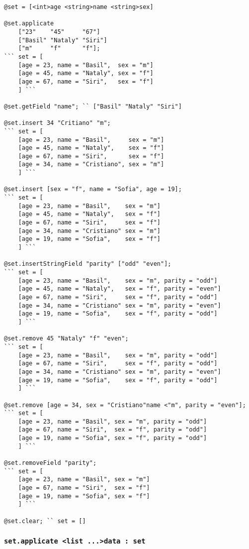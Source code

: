 \begin{lstlisting}[caption=Методы класса set, label=setmethods]
@set = [<int>age <string>name <string>sex]

@set.applicate 
	["23"    "45"     "67"]
	["Basil" "Nataly" "Siri"]
	["m"     "f"      "f"];
``` set = [
    [age = 23, name = "Basil",  sex = "m"]
	[age = 45, name = "Nataly", sex = "f"]
	[age = 67, name = "Siri",   sex = "f"]
	] ```

@set.getField "name"; `` ["Basil" "Nataly" "Siri"]

@set.insert 34 "Critiano" "m";
``` set = [
    [age = 23, name = "Basil",     sex = "m"]
	[age = 45, name = "Nataly",    sex = "f"]
	[age = 67, name = "Siri",      sex = "f"]
	[age = 34, name = "Cristiano", sex = "m"]
	] ```

@set.insert [sex = "f", name = "Sofia", age = 19];
``` set = [
    [age = 23, name = "Basil",    sex = "m"]
	[age = 45, name = "Nataly",   sex = "f"]
	[age = 67, name = "Siri",     sex = "f"]
	[age = 34, name = "Cristiano" sex = "m"]
	[age = 19, name = "Sofia",    sex = "f"]
	] ```

@set.insertStringField "parity" ["odd" "even"];
``` set = [
    [age = 23, name = "Basil",    sex = "m", parity = "odd"]
	[age = 45, name = "Nataly",   sex = "f", parity = "even"]
	[age = 67, name = "Siri",     sex = "f", parity = "odd"]
	[age = 34, name = "Cristiano" sex = "m", parity = "even"]
	[age = 19, name = "Sofia",    sex = "f", parity = "odd"]
	] ```

@set.remove 45 "Nataly" "f" "even";
``` set = [
    [age = 23, name = "Basil",    sex = "m", parity = "odd"]
	[age = 67, name = "Siri",     sex = "f", parity = "odd"]
	[age = 34, name = "Cristiano" sex = "m", parity = "even"]
	[age = 19, name = "Sofia",    sex = "f", parity = "odd"]
	] ```

@set.remove [age = 34, sex = "Cristiano"name <"m", parity = "even"];
``` set = [
    [age = 23, name = "Basil", sex = "m", parity = "odd"]
	[age = 67, name = "Siri",  sex = "f", parity = "odd"]
	[age = 19, name = "Sofia", sex = "f", parity = "odd"]
	] ```

@set.removeField "parity";
``` set = [
    [age = 23, name = "Basil", sex = "m"]
	[age = 67, name = "Siri",  sex = "f"]
	[age = 19, name = "Sofia", sex = "f"]
	] ```

@set.clear; `` set = []
\end{lstlisting}

\subsubsection{\lstinline|set.applicate <list ...>data : set|}

